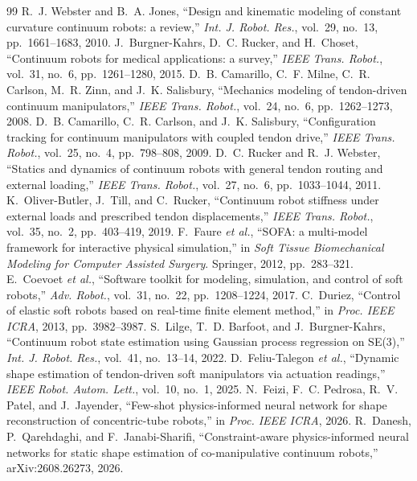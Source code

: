 \documentclass[conference]{IEEEtran}
\begin{document}
\begin{thebibliography}{99}\footnotesize\setlength{\itemsep}{0pt}
 R.~J. Webster and B.~A. Jones, ``Design and kinematic modeling of constant curvature continuum robots: a review,'' \emph{Int. J. Robot. Res.}, vol.~29, no.~13, pp.~1661--1683, 2010.
 J.~Burgner-Kahrs, D.~C. Rucker, and H.~Choset, ``Continuum robots for medical applications: a survey,'' \emph{IEEE Trans. Robot.}, vol.~31, no.~6, pp.~1261--1280, 2015.
 D.~B. Camarillo, C.~F. Milne, C.~R. Carlson, M.~R. Zinn, and J.~K. Salisbury, ``Mechanics modeling of tendon-driven continuum manipulators,'' \emph{IEEE Trans. Robot.}, vol.~24, no.~6, pp.~1262--1273, 2008.
 D.~B. Camarillo, C.~R. Carlson, and J.~K. Salisbury, ``Configuration tracking for continuum manipulators with coupled tendon drive,'' \emph{IEEE Trans. Robot.}, vol.~25, no.~4, pp.~798--808, 2009.
 D.~C. Rucker and R.~J. Webster, ``Statics and dynamics of continuum robots with general tendon routing and external loading,'' \emph{IEEE Trans. Robot.}, vol.~27, no.~6, pp.~1033--1044, 2011.
 K.~Oliver-Butler, J.~Till, and C.~Rucker, ``Continuum robot stiffness under external loads and prescribed tendon displacements,'' \emph{IEEE Trans. Robot.}, vol.~35, no.~2, pp.~403--419, 2019.
 F.~Faure \emph{et al.}, ``SOFA: a multi-model framework for interactive physical simulation,'' in \emph{Soft Tissue Biomechanical Modeling for Computer Assisted Surgery}. Springer, 2012, pp.~283--321.
 E.~Coevoet \emph{et al.}, ``Software toolkit for modeling, simulation, and control of soft robots,'' \emph{Adv. Robot.}, vol.~31, no.~22, pp.~1208--1224, 2017.
 C.~Duriez, ``Control of elastic soft robots based on real-time finite element method,'' in \emph{Proc. IEEE ICRA}, 2013, pp.~3982--3987.
 S.~Lilge, T.~D. Barfoot, and J.~Burgner-Kahrs, ``Continuum robot state estimation using Gaussian process regression on SE(3),'' \emph{Int. J. Robot. Res.}, vol.~41, no.~13--14, 2022.
 D.~Feliu-Talegon \emph{et al.}, ``Dynamic shape estimation of tendon-driven soft manipulators via actuation readings,'' \emph{IEEE Robot. Autom. Lett.}, vol.~10, no.~1, 2025.
 N.~Feizi, F.~C. Pedrosa, R.~V. Patel, and J.~Jayender, ``Few-shot physics-informed neural network for shape reconstruction of concentric-tube robots,'' in \emph{Proc. IEEE ICRA}, 2026.
 R.~Danesh, P.~Qarehdaghi, and F.~Janabi-Sharifi, ``Constraint-aware physics-informed neural networks for static shape estimation of co-manipulative continuum robots,'' arXiv:2608.26273, 2026.

\end{thebibliography}
\end{document}
